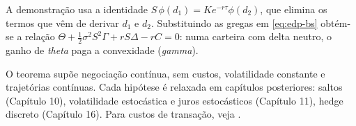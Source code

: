 A demonstração usa a identidade $S\,\phi(d_1)=Ke^{-r\tau}\phi(d_2)$, que elimina os termos que vêm de derivar $d_1$ e $d_2$. Substituindo as gregas em \eqref{eq:edp-bs} obtém-se a relação $\Theta+\tfrac12\sigma^2S^2\Gamma+rS\Delta-rC=0$: numa carteira com delta neutro, o ganho de \emph{theta} paga a convexidade (\emph{gamma}).

\begin{observacao}[Hipóteses]
O teorema supõe negociação contínua, sem custos, volatilidade constante e trajetórias contínuas. Cada hipótese é relaxada em capítulos posteriores: saltos (Capítulo 10), volatilidade estocástica e juros estocásticos (Capítulo 11), hedge discreto (Capítulo 16). Para custos de transação, veja \citet{leland1985}.
\end{observacao}
